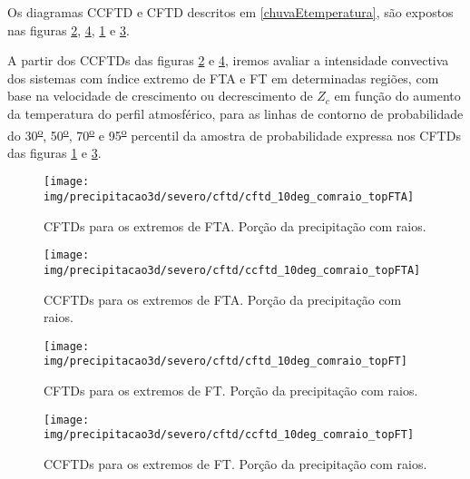 Os diagramas CCFTD e CFTD descritos em \ref{chuvaEtemperatura}, são expostos nas figuras \ref{ccftd_fta_com}, \ref{ccftd_ft_com}, \ref{cftd_fta_com} e \ref{cftd_ft_com}.

A partir dos CCFTDs das figuras \ref{ccftd_fta_com} e \ref{ccftd_ft_com}, iremos avaliar a intensidade convectiva dos sistemas com índice extremo de FTA e FT em determinadas regiões, com base na velocidade de crescimento ou decrescimento de $Z_{c}$ em função do aumento da temperatura do perfil atmosférico, para as linhas de contorno de probabilidade do 30\textsuperscript{\underline{o}}, 50\textsuperscript{\underline{o}}, 70\textsuperscript{\underline{o}} e 95\textsuperscript{\underline{o}} percentil da amostra de probabilidade  expressa nos CFTDs das figuras \ref{cftd_fta_com} e \ref{cftd_ft_com}.	

\begin{figure}[!ht]
  \centering
  \texttt{[image: img/precipitacao3d/severo/cftd/cftd\_10deg\_comraio\_topFTA]}
 \caption{CFTDs para os extremos de FTA. Porção da precipitação com raios.}
 \label{cftd_fta_com}
\end{figure} 

\begin{figure}[!ht]
  \centering
  \texttt{[image: img/precipitacao3d/severo/cftd/ccftd\_10deg\_comraio\_topFTA]}
  \caption{CCFTDs para os extremos de FTA. Porção da precipitação com raios.}
  \label{ccftd_fta_com}   
\end{figure} 

 

\begin{figure}[!ht]
  \centering
  \texttt{[image: img/precipitacao3d/severo/cftd/cftd\_10deg\_comraio\_topFT]}
 \caption{CFTDs para os extremos de FT. Porção da precipitação com raios.}
 \label{cftd_ft_com}
\end{figure} 

\begin{figure}[!ht]
  \centering
  \texttt{[image: img/precipitacao3d/severo/cftd/ccftd\_10deg\_comraio\_topFT]}
  \caption{CCFTDs para os extremos de FT. Porção da precipitação com raios.}
  \label{ccftd_ft_com}   
\end{figure} 

